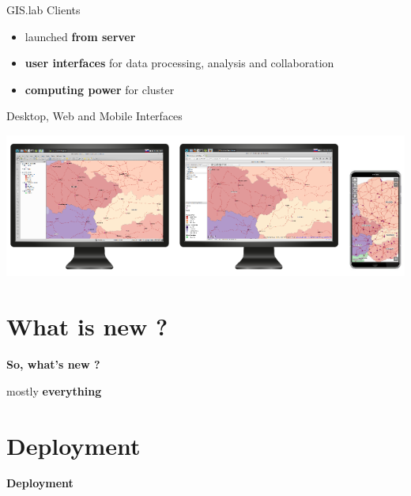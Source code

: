 \documentclass[12pt]{beamer}
\begin{document}
\begin{frame}{GIS.lab Clients}
	\begin{itemize}
		\item launched \textbf{from server}
		\item \textbf{user interfaces} for data processing, analysis and collaboration
		\item \textbf{computing power} for cluster
	\end{itemize}
\end{frame}

\begin{frame}{Desktop, Web and Mobile Interfaces}
	\begin{center}
		\includegraphics[keepaspectratio=true,height=0.5\textheight]{images/gislab-desktop-web-mobile.png}
	\end{center}
\end{frame}


\section{What is new ?}
\begin{frame}
	\begin{center}
		\LARGE\textbf{So, what's new ?}	
	\end{center}
\end{frame}

\begin{frame}
	\begin{center}
		mostly \textbf{everything}
	\end{center}
\end{frame}


\section{Deployment}
\begin{frame}
	\begin{center}
		\LARGE\textbf{Deployment}	
	\end{center}
\end{frame}
\end{document}
